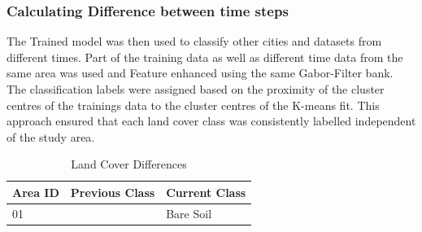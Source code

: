 \documentclass[12pt,a4paper, english,twoside]{article}
\begin{document}
      \subsubsection{Calculating Difference between time steps}
      The Trained model was then used to classify other cities and datasets from different times. 
      Part of the training data as well as different time data from the same area was used and Feature enhanced using the same Gabor-Filter bank.
      The classification labels were assigned based on the proximity of the cluster centres of the trainings data to the cluster centres of the K-means fit.
      This approach ensured that each land cover class was consistently labelled independent of the study area.\\
      \begin{table}[ht]
          \begin{minipage}{\textwidth}
          \centering
          \renewcommand{\arraystretch}{1.4}
          \caption{Land Cover Differences}\label{tab:land_cover_diff}
          \begin{tabular}{p{1cm}p{4cm}l}
            \toprule
            \textbf{Area ID} & \textbf{Previous Class} & \textbf{Current Class}\\
            \midrule
            01 & & Bare Soil \\
            \bottomrule
        \end{tabular}
       \end{minipage}
      \end{table}
       
\end{document}
